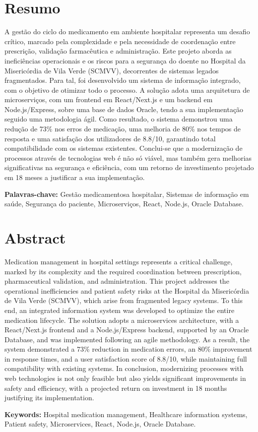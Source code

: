 \chapter*{Resumo}

A gestão do ciclo do medicamento em ambiente hospitalar representa um desafio crítico, marcado pela complexidade e pela necessidade de coordenação entre prescrição, validação farmacêutica e administração. Este projeto aborda as ineficiências operacionais e os riscos para a segurança do doente no Hospital da Misericórdia de Vila Verde (SCMVV), decorrentes de sistemas legados fragmentados. Para tal, foi desenvolvido um sistema de informação integrado, com o objetivo de otimizar todo o processo. A solução adota uma arquitetura de microserviços, com um frontend em React/Next.js e um backend em Node.js/Express, sobre uma base de dados Oracle, tendo a sua implementação seguido uma metodologia ágil. Como resultado, o sistema demonstrou uma redução de 73\% nos erros de medicação, uma melhoria de 80\% nos tempos de resposta e uma satisfação dos utilizadores de 8.8/10, garantindo total compatibilidade com os sistemas existentes. Conclui-se que a modernização de processos através de tecnologias web é não só viável, mas também gera melhorias significativas na segurança e eficiência, com um retorno de investimento projetado em 18 meses a justificar a sua implementação.

\vspace{6mm}
\noindent\textbf{Palavras-chave:} Gestão medicamentosa hospitalar, Sistemas de informação em saúde, Segurança do paciente, Microserviços, React, Node.js, Oracle Database.

\vspace*{\fill}

\chapter*{Abstract}

Medication management in hospital settings represents a critical challenge, marked by its complexity and the required coordination between prescription, pharmaceutical validation, and administration. This project addresses the operational inefficiencies and patient safety risks at the Hospital da Misericórdia de Vila Verde (SCMVV), which arise from fragmented legacy systems. To this end, an integrated information system was developed to optimize the entire medication lifecycle. The solution adopts a microservices architecture, with a React/Next.js frontend and a Node.js/Express backend, supported by an Oracle Database, and was implemented following an agile methodology. As a result, the system demonstrated a 73\% reduction in medication errors, an 80\% improvement in response times, and a user satisfaction score of 8.8/10, while maintaining full compatibility with existing systems. In conclusion, modernizing processes with web technologies is not only feasible but also yields significant improvements in safety and efficiency, with a projected return on investment in 18 months justifying its implementation.

\vspace{6mm}
\noindent\textbf{Keywords:} Hospital medication management, Healthcare information systems, Patient safety, Microservices, React, Node.js, Oracle Database. 